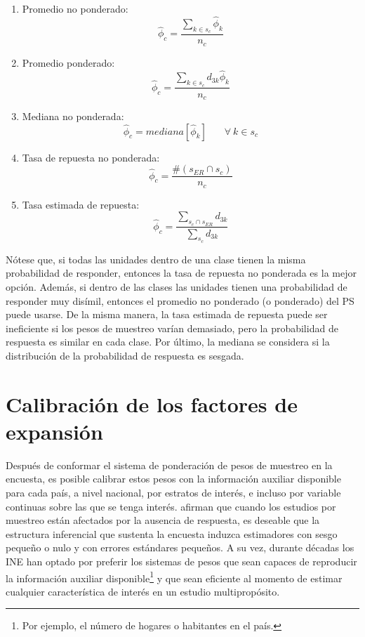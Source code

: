 \documentclass[
  12pt,
]{book}
\begin{document}
\begin{enumerate}
\def\labelenumi{\arabic{enumi}.}
\item
  Promedio no ponderado:
  \[\hat{\phi}_c = \frac{\sum_{k \in s_c}\hat{\phi}_k}{n_c}\]
\item
  Promedio ponderado:
  \[\hat{\phi}_c = \frac{\sum_{k \in s_c}d_{3k}\hat{\phi}_k}{n_c}\]
\item
  Mediana no ponderada:
  \[\hat{\phi}_c = mediana[\hat{\phi}_k]  \ \ \ \ \ \ \ \ \forall \ k  \in s_c\]
\item
  Tasa de repuesta no ponderada:
  \[\hat{\phi}_c = \frac{\#(s_{ER}\cap s_c)}{n_c}\]
\item
  Tasa estimada de repuesta:
  \[\hat{\phi}_c = \frac{\sum_{s_c \cap s_{ER}}d_{3k}}{\sum_{s_c}d_{3k}}\]
\end{enumerate}

Nótese que, si todas las unidades dentro de una clase tienen la misma probabilidad de responder, entonces la tasa de repuesta no ponderada es la mejor opción. Además, si dentro de las clases las unidades tienen una probabilidad de responder muy disímil, entonces el promedio no ponderado (o ponderado) del PS puede usarse. De la misma manera, la tasa estimada de repuesta puede ser ineficiente si los pesos de muestreo varían demasiado, pero la probabilidad de respuesta es similar en cada clase. Por último, la mediana se considera si la distribución de la probabilidad de respuesta es sesgada.

\hypertarget{calibraciuxf3n-de-los-factores-de-expansiuxf3n}{%
\section{Calibración de los factores de expansión}\label{calibraciuxf3n-de-los-factores-de-expansiuxf3n}}

Después de conformar el sistema de ponderación de pesos de muestreo en la encuesta, es posible calibrar estos pesos con la información auxiliar disponible para cada país, a nivel nacional, por estratos de interés, e incluso por variable continuas sobre las que se tenga interés. \citet{Sarndal_Lundstrom_2006} afirman que cuando los estudios por muestreo están afectados por la ausencia de respuesta, es deseable que la estructura inferencial que sustenta la encuesta induzca estimadores con sesgo pequeño o nulo y con errores estándares pequeños. A su vez, durante décadas los INE han optado por preferir los sistemas de pesos que sean capaces de reproducir la información auxiliar disponible\footnote{Por ejemplo, el número de hogares o habitantes en el país.} y que sean eficiente al momento de estimar cualquier característica de interés en un estudio multipropósito.
\end{document}
